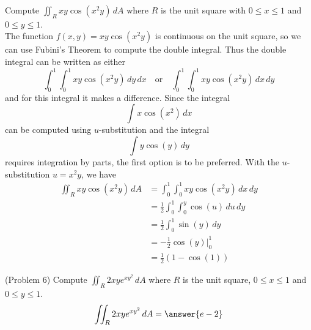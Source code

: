 \documentclass[handout]{ximera}
\begin{document}
\begin{example}[Example 6]
Compute $\iint_R xy\cos(x^2y) \, dA$ where $R$ is the unit square with $0 \leq x \leq 1$ and $0 \leq y \leq 1$.\\
The function $f(x,y) = xy\cos(x^2y)$ is continuous on the unit square, so we can use Fubini's Theorem to compute the double integral.
Thus the double integral can be written as either
\[
\int_0^1 \int_0^1 xy\cos(x^2y) \, dy\, dx \quad \text{or} \quad \int_0^1 \int_0^1 xy\cos(x^2y) \, dx\, dy
\]
and for this integral it makes a difference.
Since the integral
\[
\int x \cos(x^2) \, dx
\]
can be computed using $u$-substitution and the integral
\[
\int y \cos (y) \, dy
\]
requires integration by parts, the first option is to be preferred.
With the $u$-substitution $u = x^2y$, we have
\begin{align*}
\iint_R xy\cos(x^2y) \, dA &= \int_0^1 \int_0^1 xy\cos(x^2y) \, dx\, dy\\
                          &= \frac12 \int_0^1 \int_0^y \cos(u) \, du \, dy\\
                          &= \frac12 \int_0^1 \sin(y) \, dy\\
                          &= -\frac12 \cos(y) \bigg|_0^1\\
                          &= \frac12 \left(1 - \cos(1)\right)
\end{align*}
\end{example}


\begin{problem}(Problem 6)
Compute $\iint_R 2xy e^{xy^2} \, dA$ where $R$ is the unit square, $0 \leq x \leq 1$ and $0 \leq y \leq 1$.\\
\[
\iint_R 2xy e^{xy^2} \, dA = \answer{e-2}
\]
\end{problem}
\end{document}

